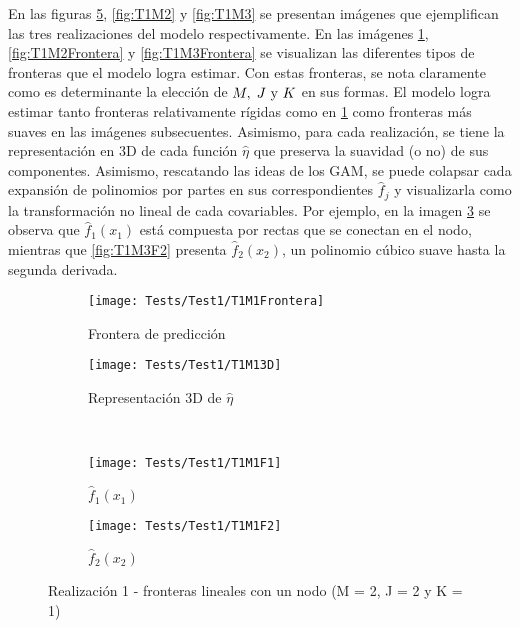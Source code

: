 \documentclass[../Main/Main.tex]{subfiles}
\begin{document}
En las figuras \ref{fig:T1M1}, \ref{fig:T1M2} y \ref{fig:T1M3} se presentan imágenes que ejemplifican las tres realizaciones del modelo respectivamente. En las imágenes \ref{fig:T1M1Frontera}, \ref{fig:T1M2Frontera} y \ref{fig:T1M3Frontera} se visualizan las diferentes tipos de fronteras que el modelo logra estimar. Con estas fronteras, se nota claramente como es determinante la elección de $M,\;J\text{ y }K$ en sus formas. El modelo logra estimar tanto fronteras relativamente rígidas como en \ref{fig:T1M1Frontera} como fronteras más suaves en las imágenes subsecuentes. Asimismo, para cada realización, se tiene la representación en 3D de cada función $\hat{\eta}$ que preserva la suavidad (o no) de sus componentes. Asimismo, rescatando las ideas de los GAM, se puede colapsar cada expansión de polinomios por partes en sus correspondientes $\hat{f}_j$ y visualizarla como la transformación no lineal de cada covariables. Por ejemplo, en la imagen \ref{fig:T1M1F1} se observa que $\hat{f}_1(x_1)$ está compuesta por rectas que se conectan en el nodo, mientras que \ref{fig:T1M3F2} presenta $\hat{f}_2(x_2)$, un polinomio cúbico suave hasta la segunda derivada.  

\begin{figure}[p]
	\centering
	\begin{subfigure}[b]{0.45\textwidth}
    	\texttt{[image: Tests/Test1/T1M1Frontera]}
		\caption{Frontera de predicción}
		\label{fig:T1M1Frontera}
	\end{subfigure}
	\hfill    
    \begin{subfigure}[b]{0.45\textwidth}
        \texttt{[image: Tests/Test1/T1M13D]}
        \caption{Representación 3D de $\hat{\eta}$}
        \label{fig:T1M13D}
    \end{subfigure}
    \\[3pt]
    \begin{subfigure}[b]{0.45\textwidth}
    	\texttt{[image: Tests/Test1/T1M1F1]}
		\caption{$\hat{f}_1(x_1)$}
		\label{fig:T1M1F1}
	\end{subfigure}
	\hfill    
    \begin{subfigure}[b]{0.45\textwidth}
        \texttt{[image: Tests/Test1/T1M1F2]}
        \caption{$\hat{f}_2(x_2)$}
        \label{fig:T1M1F2}
    \end{subfigure}
    \caption{Realización 1 - fronteras lineales con un nodo (M = 2, J = 2 y K = 1)}
    \label{fig:T1M1}
\end{figure}
\end{document}
